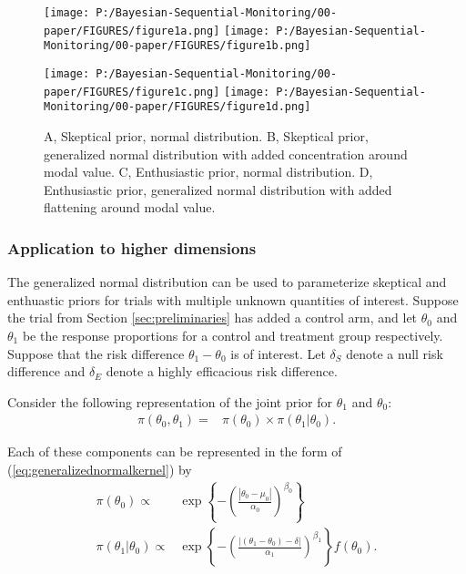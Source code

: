 \documentclass[12pt]{article}
\begin{document}
%

\begin{figure}
\texttt{[image: P:/Bayesian-Sequential-Monitoring/00-paper/FIGURES/figure1a.png]}
\texttt{[image: P:/Bayesian-Sequential-Monitoring/00-paper/FIGURES/figure1b.png]}

\texttt{[image: P:/Bayesian-Sequential-Monitoring/00-paper/FIGURES/figure1c.png]}
\texttt{[image: P:/Bayesian-Sequential-Monitoring/00-paper/FIGURES/figure1d.png]}

\caption{A, Skeptical prior, normal distribution. B, Skeptical prior, generalized normal distribution with added concentration around modal value. C, Enthusiastic prior, normal distribution. D, Enthusiastic prior, generalized normal distribution with added flattening around modal value.}
\label{fig:figure1}
\end{figure}

%
\subsubsection{Application to higher dimensions}
The generalized normal distribution can be used to parameterize skeptical and enthuastic priors for trials with multiple unknown quantities of interest. Suppose the trial from Section \ref{sec:preliminaries} has added a control arm, and let $\theta_0$ and $\theta_1$ be the response proportions for a control and treatment group respectively. Suppose that the risk difference $\theta_1-\theta_0$ is of interest. Let $\delta_{S}$ denote a null risk difference and $\delta_{E}$ denote a highly efficacious risk difference.


Consider the following representation of the joint prior for $\theta_1$ and $\theta_0$:
\begin{align}
\pi(\theta_0,\theta_1)=&\pi(\theta_0)\times\pi(\theta_1|\theta_0). \label{eq:generalized_normal_joint}
\end{align}

Each of these components can be represented in the form of (\ref{eq:generalizednormalkernel}) by
\begin{align}
\pi(\theta_0)\propto&\exp\left\{-\left(\frac{|\theta_0-\mu_0|}{\alpha_0}\right)^{\beta_0}\right\} \label{eq:generalized_normal_PC}\\
\pi(\theta_1|\theta_0)\propto&\exp\left\{-\left(\frac{|(\theta_1-\theta_0)-\delta|}{\alpha_1}\right)^{\beta_1}\right\}f(\theta_0). \label{eq:generalized_normal_IP}
\end{align}
\end{document}
